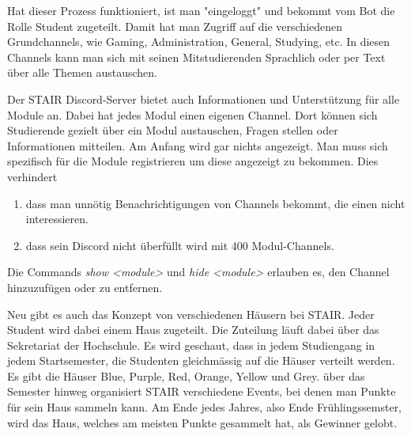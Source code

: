 \documentclass[a4paper, table]{article}
\begin{document}
Hat dieser Prozess funktioniert, ist man "eingeloggt" und bekommt vom Bot die Rolle Student zugeteilt. Damit hat man Zugriff auf
die verschiedenen Grundchannels, wie Gaming, Administration, General, Studying, etc.
In diesen Channels kann man sich mit seinen Mitstudierenden Sprachlich oder per Text \"uber alle Themen austauschen.
\newline

Der STAIR Discord-Server bietet auch Informationen und Unterst\"utzung f\"ur alle Module an. Dabei hat jedes Modul einen eigenen Channel.
Dort k\"onnen sich Studierende gezielt \"uber ein Modul austauschen, Fragen stellen oder Informationen mitteilen.
Am Anfang wird gar nichts angezeigt. Man muss sich spezifisch f\"ur die Module registrieren um diese angezeigt zu bekommen. Dies verhindert

\begin{enumerate}
    \item dass man unn\"otig Benachrichtigungen von Channels bekommt, die einen nicht interessieren.
    \item dass sein Discord nicht \"uberf\"ullt wird mit 400 Modul-Channels.
\end{enumerate}

Die Commands \textit{show <module>} und \textit{hide <module>} erlauben es, den Channel hinzuzuf\"ugen oder zu entfernen.
\newline

Neu gibt es auch das Konzept von verschiedenen H\"ausern bei STAIR. Jeder Student wird dabei einem Haus zugeteilt. Die Zuteilung l\"auft
dabei \"uber das Sekretariat der Hochschule. Es wird geschaut, dass in jedem Studiengang in jedem Startsemester, die Studenten gleichm\"assig
auf die H\"auser verteilt werden.
Es gibt die H\"auser Blue, Purple, Red, Orange, Yellow und Grey. \"uber das Semester hinweg organisiert STAIR verschiedene Events, bei denen
man Punkte f\"ur sein Haus sammeln kann. Am Ende jedes Jahres, also Ende Fr\"uhlingssemster, wird das Haus, welches am meisten Punkte
gesammelt hat, als Gewinner gelobt.
\end{document}
